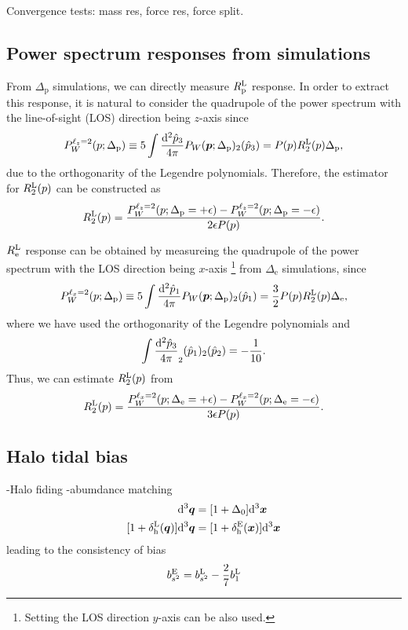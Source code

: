 \documentclass[a4paper,11pt]{article}
\let\L\relax
\DeclareMathOperator{\L}{\mathcal{L}}
\renewcommand{\d}{\mathrm{d}}
\newcommand{\vx}{{\bm x}}
\newcommand{\vq}{{\bm q}}
\newcommand{\vp}{{\bm p}}
\begin{document}
Convergence tests: mass res, force res, force split.

\subsection{Power spectrum responses from simulations}
From $\Delta_\mathrm{p}$ simulations, we can directly measure $R^{\rm L}_{\rm p}$ response.
In order to extract this response, it is natural to consider the quadrupole of the power spectrum with the line-of-sight (LOS) direction being $z$-axis since
\begin{align}
P^{\ell_z=2}_W(p;\Delta_{\rm p}) \equiv
5\int \frac{\d^2\hat p_3}{4\pi} P_W(\vp;\Delta_{\rm p}) \L_2(\hat p_3)
=P(p)R_2^{\rm L}(p)\Delta_{\rm p},
\end{align}
due to the orthogonarity of the Legendre polynomials.
Therefore, the estimator for $R_2^{\rm L}(p)$ can be constructed as
\begin{align}
R_2^{\rm L}(p) = \frac{P_W^{\ell_z=2}(p;\Delta_\mathrm{p}=+\epsilon) - P_W^{\ell_z=2}(p;\Delta_\mathrm{p}=-\epsilon)}{2\epsilon P(p)}.
\end{align}

$R^{\rm L}_{\rm e}$ response can be obtained by measureing the quadrupole of the power spectrum with the LOS direction being $x$-axis
\footnote{Setting the LOS direction $y$-axis can be also used.} from $\Delta_\mathrm{e}$ simulations, since
\begin{align}
P^{\ell_x=2}_W(p;\Delta_{\rm p}) \equiv
5\int \frac{\d^2\hat p_1}{4\pi} P_W(\vp;\Delta_{\rm p}) \L_2(\hat p_1)
=\frac{3}{2}P(p)R_2^{\rm L}(p)\Delta_{\rm e},
\end{align}
where we have used the orthogonarity of the Legendre polynomials and
\begin{align}
\int \frac{\d^2\hat p_3}{4\pi} \L_2(\hat p_1)\L_2(\hat p_2)
=-\frac{1}{10}.
\end{align}
Thus, we can estimate $R_2^{\rm L}(p)$ from 
\begin{align}
R_2^{\rm L}(p) = \frac{P_W^{\ell_x=2}(p;\Delta_\mathrm{e}=+\epsilon) - P_W^{\ell_x=2}(p;\Delta_\mathrm{e}=-\epsilon)}{3\epsilon P(p)}.
\end{align}

\subsection{Halo tidal bias}
-Halo fiding
-abumdance matching
\begin{align}
\d^3\vq &= [1+\Delta_0]\d^3\vx
\\
[1+\delta^{\rm L}_{\rm h}(\vq)]\d^3\vq &= [1+\delta^{\rm E}_{\rm h}(\vx)]\d^3\vx
\end{align}
leading to the consistency of bias
\begin{align}
b^{\rm E}_{s^2} = b^{\rm L}_{s^2} -\frac{2}{7}b_1^{\rm L}
\end{align}
\end{document}
